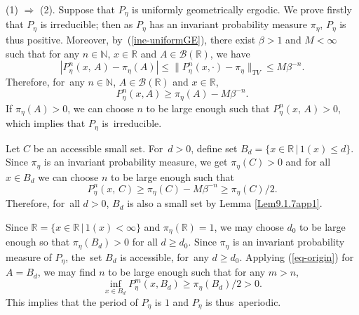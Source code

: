 \documentclass[11pt]{elsarticle}
\def\geq{\geqslant}
\def\leq{\leqslant}
\def\N{\mathbb{N}}
\def\R{\mathbb{R}}
\begin{document}
\begin{pf} 
	(1) $\Longrightarrow$ (2). Suppose that $P_\eta$ is uniformly geometrically ergodic. We prove firstly that $P_\eta$ is irreducible; then as $P_{\eta}$ has an invariant probability measure $\pi_\eta$, $P_{\eta}$ is thus positive. Moreover, by~(\ref{ine-uniformGE}), there exist $\beta>1$ and $M<\infty$ such that for any $n\in\N$, $x\in \R$ and $A\in\mathcal{B}(\R)$, we have
	\begin{equation}\label{eq1}
		|P_{\eta}^n(x,\, A)-\pi_\eta(A)|\leq\|P^n_\eta(x,\cdot)-\pi_\eta\|_{TV}\leq M\beta^{-n}.
	\end{equation}
	Therefore, for~any $n\in\N$, $A\in\mathcal{B}(\R)$ and $x\in \R$,
	\begin{equation}\label{eq-origin}
		P^n_\eta(x,A)\geq\pi_\eta(A)-M\beta^{-n}.
	\end{equation}
	If $\pi_\eta(A)>0$, we can choose $n$ to be large enough such that $P^n_\eta(x,\,A)>0$, which implies that $P_\eta$ is~irreducible.
	
	Let $C$ be an accessible small set. For~$d>0$, define set $B_d=\{x\in\R\,|\,1(x)\leq d\}$. Since $\pi_\eta$ is an invariant probability measure, we get $\pi_\eta(C)>0$ and for all $x\in B_d$ we can choose $n$ to be large enough such that
	\begin{equation*}
		P_\eta^n(x,\,C)\geq\pi_\eta(C)-M\beta^{-n}\geq\pi_\eta(C)/2.
	\end{equation*}
	Therefore, for~all $d>0$, $B_d$ is also a small set by Lemma \ref{Lem9.1.7app1}.
	
	Since $\R=\{x\in\R\,|\,1(x)< \infty\}$ and $\pi_\eta(\R)=1$, we may choose $d_0$ to be large enough so that $\pi_\eta(B_d)>0$ for all $d\geq d_0$. Since $\pi_\eta$ is an invariant probability measure of $P_\eta$, the~set $B_d$ is accessible, for~any $d\geq d_0$. Applying (\ref{eq-origin}) for $A=B_d$, we may find $n$ to be large enough such that for any $m>n$, 
	$$\inf_{x\in B_d}P_\eta^m(x,B_d)\geq\pi_{\eta}(B_d)/2>0.$$ 
	This implies that the period of $P_\eta$ is $1$ and $P_\eta$ is thus~aperiodic. 
	

\end{pf}
\end{document}
